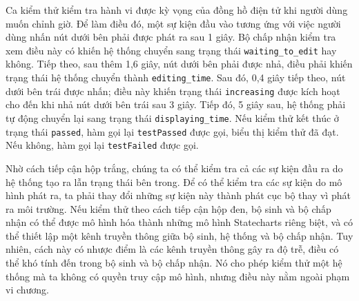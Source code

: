 Ca kiểm thử kiểm tra hành vi được kỳ vọng của đồng hồ điện tử khi người dùng muốn chỉnh giờ. Để làm điều đó, một sự kiện đầu vào tương ứng với việc người dùng nhấn nút dưới bên phải được phát ra sau 1 giây. Bộ chấp nhận kiểm tra xem điều này có khiến hệ thống chuyển sang trạng thái \texttt{waiting\_to\_edit} hay không. Tiếp theo, sau thêm 1,6 giây, nút dưới bên phải được nhả, điều phải khiến trạng thái hệ thống chuyển thành \texttt{editing\_time}. Sau đó, 0,4 giây tiếp theo, nút dưới bên trái được nhấn; điều này khiến trạng thái \texttt{increasing} được kích hoạt cho đến khi nhả nút dưới bên trái sau 3 giây. Tiếp đó, 5 giây sau, hệ thống phải tự động chuyển lại sang trạng thái \texttt{displaying\_time}. Nếu kiểm thử kết thúc ở trạng thái \texttt{passed}, hàm gọi lại \texttt{testPassed} được gọi, biểu thị kiểm thử đã đạt. Nếu không, hàm gọi lại \texttt{testFailed} được gọi.

Nhờ cách tiếp cận hộp trắng, chúng ta có thể kiểm tra cả các sự kiện đầu ra do hệ thống tạo ra lẫn trạng thái bên trong. Để có thể kiểm tra các sự kiện do mô hình phát ra, ta phải thay đổi những sự kiện này thành phát cục bộ thay vì phát ra môi trường. Nếu kiểm thử theo cách tiếp cận hộp đen, bộ sinh và bộ chấp nhận có thể được mô hình hóa thành những mô hình Statecharts riêng biệt, và có thể thiết lập một kênh truyền thông giữa bộ sinh, hệ thống và bộ chấp nhận. Tuy nhiên, cách này có nhược điểm là các kênh truyền thông gây ra độ trễ, điều có thể khó tính đến trong bộ sinh và bộ chấp nhận. Nó cho phép kiểm thử một hệ thống mà ta không có quyền truy cập mô hình, nhưng điều này nằm ngoài phạm vi chương.

\clearpage

